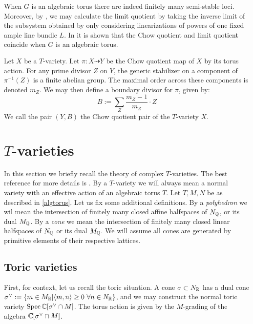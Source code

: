 When \(G\) is an algebraic torus there are indeed finitely many semi-stable loci. Moreover, by \cite[Corollary 2.7]{baker2012}, we may calculate the limit quotient by taking the inverse limit of the subsystem obtained by only considering linearizations of powers of one fixed ample line bundle \(L\).
%
%
%
In \cite[Proposition 2.5]{baker2012} it is shown that the Chow quotient and limit quotient coincide when \(G\) is an algebraic torus.
\begin{definition}
Let \(X\) be a \(T\)-variety. Let \(\pi:X \dashrightarrow Y\) be the Chow quotient map of \(X\) by its torus action. For any prime divisor \(Z\) on \(Y\), the generic stabilizer on a component of \(\pi^{-1}(Z)\) is a finite abelian group. The maximal order across these components is denoted \(m_Z\). We may then define a boundary divisor for \(\pi\), given by:
\begin{equation} \label{boundary}
B := \sum_Z \frac{m_Z-1}{m_Z} \cdot Z
\end{equation}
We call the pair \((Y,B)\) the Chow quotient pair of the \(T\)-variety \(X\).
\end{definition}
\section{$T$-varieties} \label{prelim:Tvar}
In this section we briefly recall the theory of complex \(T\)-varieties. The best reference for more details is \cite{altmann2006polyhedral}. By a \(T\)-variety we will always mean a normal variety with an effective action of an algebraic torus \(T\). Let \(T,M,N\) be as described in \ref{algtorus}. Let us fix some additional definitions. By a \textit{polyhedron} we wil mean the intersection of finitely many closed affine halfspaces of \(N_{\mathbb{Q}}\), or its dual \(M_{\mathbb{Q}}\). By a \textit{cone} we mean the intersection of finitely many closed linear halfspaces of \(N_{\mathbb{Q}}\) or its dual \(M_{\mathbb{Q}}\). We will assume all cones are generated by primitive elements of their respective lattices.
\subsection{Toric varieties}
First, for context, let us recall the toric situation. A cone \(\sigma \subset N_{\mathbb{R}}\) has a dual cone \(\sigma^\vee := \{m \in M_{\mathbb{R}} | \langle m, n \rangle \ge 0 \ \forall n \in N_{\mathbb{R}}\}\), and we may construct the normal toric variety \(\operatorname{Spec} \mathbb{C}[\sigma^\vee \cap M]\). The torus action is given by the \(M\)-grading of the algebra \(\mathbb{C}[\sigma^\vee \cap M]\). 

